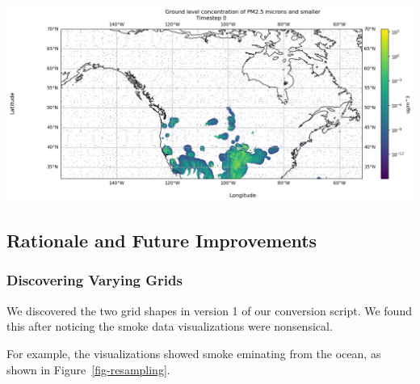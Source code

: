 \documentclass[
  letterpaper,
  DIV=11,
  numbers=noendperiod]{scrreprt}
\begin{document}
\includegraphics{data_conversion_files/figure-latex/data_notebooks-data_conversion-resample_example-cell-9-output-1.png}

\subsection{Rationale and Future
Improvements}\label{rationale-and-future-improvements-2}

\subsubsection{Discovering Varying
Grids}\label{discovering-varying-grids}

We discovered the two grid shapes in version 1 of our conversion script.
We found this after noticing the smoke data visualizations were
nonsensical.

For example, the visualizations showed smoke eminating from the ocean,
as shown in Figure~\ref{fig-resampling}.
\end{document}

